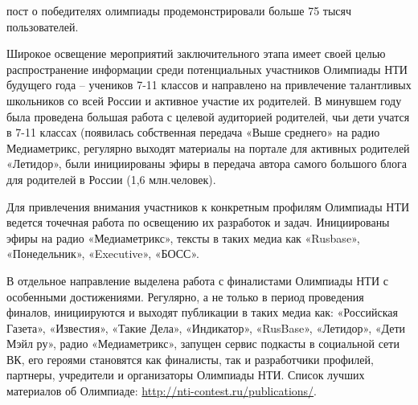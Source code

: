 пост о победителях олимпиады продемонстрировали больше 75 тысяч пользователей. 

Широкое освещение мероприятий заключительного этапа имеет своей целью распространение информации среди потенциальных участников Олимпиады НТИ будущего года – учеников 7-11 классов и направлено на привлечение талантливых школьников со всей России и активное участие их родителей. В минувшем году была проведена большая работа с целевой аудиторией родителей, чьи дети учатся в 7-11 классах (появилась собственная передача «Выше среднего» на радио Медиаметрикс, регулярно выходят материалы на портале для активных родителей «Летидор», были инициированы эфиры в передача автора самого большого блога для родителей в России (1,6 млн.человек). 

Для привлечения внимания участников к конкретным профилям Олимпиады НТИ ведется точечная работа по освещению их разработок и задач. Инициированы эфиры на радио «Медиаметрикс», тексты в таких медиа как «Rusbase», «Понедельник», «Executive», «БОСС».

В отдельное направление выделена работа с финалистами Олимпиады НТИ с особенными достижениями. Регулярно, а не только в период проведения финалов, инициируются и выходят публикации в таких медиа как: «Российская Газета», «Известия», «Такие Дела», «Индикатор», «RusBase», «Летидор», «Дети Мэйл ру», радио «Медиаметрикс», запущен сервис подкасты в социальной сети ВК, его героями становятся как финалисты, так и разработчики профилей, партнеры, учредители и организаторы Олимпиады НТИ. 
Список лучших материалов об Олимпиаде: \url{http://nti-contest.ru/publications/}.